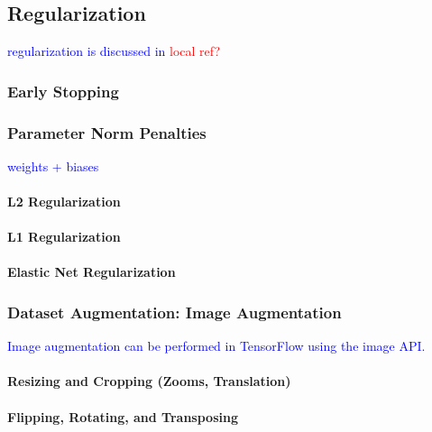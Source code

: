 \subsection{Regularization}

\textcolor{blue}{regularization is discussed in \textcolor{red}{local ref?}}

\subsubsection{Early Stopping}


\subsubsection{Parameter Norm Penalties}

\textcolor{blue}{weights + biases}

\paragraph{L2 Regularization}


\paragraph{L1 Regularization}


\paragraph{Elastic Net Regularization}



\subsubsection{Dataset Augmentation: Image Augmentation}

\textcolor{blue}{Image augmentation can be performed in TensorFlow using the image API.}

\paragraph{Resizing and Cropping (Zooms, Translation)} 



\paragraph{Flipping, Rotating, and Transposing}

